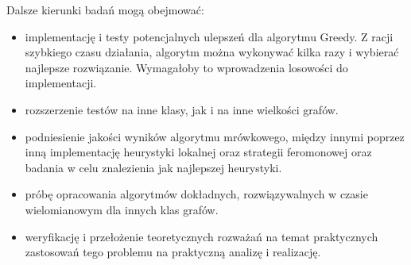 Dalsze kierunki badań mogą obejmować:
\begin{itemize}
    \item implementację i testy potencjalnych ulepszeń dla algorytmu Greedy. Z racji szybkiego czasu działania, algorytm można wykonywać kilka razy i wybierać najlepsze rozwiązanie. Wymagałoby to wprowadzenia losowości do implementacji.
    \item rozszerzenie testów na inne klasy, jak i na inne wielkości grafów.
    \item podniesienie jakości wyników algorytmu mrówkowego, między innymi poprzez inną implementację heurystyki lokalnej oraz strategii feromonowej oraz badania w celu znalezienia jak najlepszej heurystyki.
    \item próbę opracowania algorytmów dokładnych, rozwiązywalnych w czasie wielomianowym dla innych klas grafów.
    \item weryfikację i przełożenie teoretycznych rozważań na temat praktycznych zastosowań tego problemu na praktyczną analizę i realizację.
\end{itemize}
